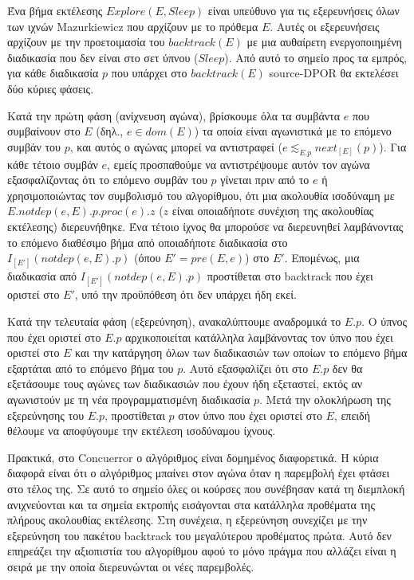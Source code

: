 Ένα βήμα εκτέλεσης $Explore(E, Sleep)$ είναι υπεύθυνο για τις εξερευνήσεις όλων των ιχνών Mazurkiewicz
που αρχίζουν με το πρόθεμα $E$. Αυτές οι εξερευνήσεις αρχίζουν με την προετοιμασία του $backtrack(E)$ με μια αυθαίρετη ενεργοποιημένη διαδικασία
που δεν είναι στο σετ ύπνου ($Sleep$). Από αυτό το σημείο προς τα εμπρός, για κάθε διαδικασία $p$ που υπάρχει στο $backtrack(E)$
source-DPOR θα εκτελέσει δύο κύριες φάσεις.

Κατά την πρώτη φάση (ανίχνευση αγώνα), βρίσκουμε όλα τα συμβάντα $e$ που συμβαίνουν στο $E$ (δηλ., $e \in dom(E)$) τα οποία είναι αγωνιστικά
με το επόμενο συμβάν του $p$, και αυτός ο αγώνας μπορεί να αντιστραφεί ($e \lesssim_{E.p} next_{[E]}(p)$). Για κάθε τέτοιο συμβάν $e$, εμείς
προσπαθούμε να αντιστρέψουμε αυτόν τον αγώνα εξασφαλίζοντας ότι το επόμενο συμβάν του $p$ γίνεται πριν από το $e$ ή χρησιμοποιώντας τον συμβολισμό
του αλγορίθμου, ότι μια ακολουθία ισοδύναμη με $E.notdep(e,E).p.proc(e).z$ ($z$ είναι οποιαδήποτε συνέχιση της ακολουθίας εκτέλεσης)
διερευνήθηκε.
Ένα τέτοιο ίχνος θα μπορούσε να διερευνηθεί λαμβάνοντας το επόμενο διαθέσιμο βήμα από οποιαδήποτε διαδικασία στο $I_{[E']}(notdep(e,E).p)$ (όπου $E'=pre(E,e)$)
στο $E'$. Επομένως, μια διαδικασία από $I_{[E']}(notdep(e,E).p)$ προστίθεται στο backtrack που έχει οριστεί στο $E'$, υπό την προϋπόθεση ότι δεν υπάρχει ήδη εκεί.

Κατά την τελευταία φάση (εξερεύνηση), ανακαλύπτουμε αναδρομικά το $E.p$. Ο ύπνος που έχει οριστεί στο $E.p$ αρχικοποιείται κατάλληλα
λαμβάνοντας τον ύπνο που έχει οριστεί στο $E$ και την κατάργηση όλων των διαδικασιών των οποίων το επόμενο βήμα εξαρτάται από το επόμενο βήμα του $p$. Αυτό εξασφαλίζει
ότι στο $E.p$ δεν θα εξετάσουμε τους αγώνες των διαδικασιών που έχουν ήδη εξεταστεί, εκτός αν αγωνιστούν με τη νέα
προγραμματισμένη διαδικασία $p$. Μετά την ολοκλήρωση της εξερεύνησης του $E.p$, προστίθεται $p$ στον ύπνο που έχει οριστεί στο $E$,
επειδή θέλουμε να αποφύγουμε την εκτέλεση ισοδύναμου ίχνους.

Πρακτικά, στο Concuerror ο αλγόριθμος είναι δομημένος διαφορετικά. Η κύρια διαφορά είναι ότι ο αλγόριθμος μπαίνει στον αγώνα
όταν η παρεμβολή έχει φτάσει στο τέλος της. Σε αυτό το σημείο όλες οι κούρσες που συνέβησαν κατά τη διεμπλοκή
ανιχνεύονται και τα σημεία εκτροπής εισάγονται στα κατάλληλα προθέματα της πλήρους ακολουθίας εκτέλεσης. Στη συνέχεια, η εξερεύνηση
συνεχίζει με την εξερεύνηση του πακέτου backtrack του μεγαλύτερου προθέματος πρώτα. Αυτό δεν επηρεάζει την αξιοπιστία του αλγορίθμου
αφού το μόνο πράγμα που αλλάζει είναι η σειρά με την οποία διερευνώνται οι νέες παρεμβολές.


